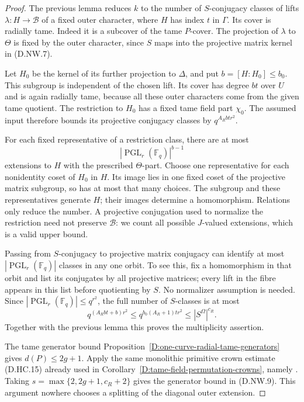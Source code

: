 \begin{proof}
The previous lemma reduces $k$ to the number of
$S$-conjugacy classes of lifts
$\lambda:H\to\mathcal B$ of a fixed outer character,
where $H$ has index $t$ in $\Gamma$. Its cover is
radially tame. Indeed it is a subcover of the tame
$P$-cover. The projection of $\lambda$ to $\Theta$
is fixed by the outer character, since $S$ maps into
the projective matrix kernel in (D.NW.7).

Let $H_0$ be the kernel of its further projection to
$\Delta$, and put $b=[H:H_0]\leq b_0$. This subgroup
is independent of the chosen lift. Its cover has
degree $bt$ over $U$ and is again radially tame,
because all these outer characters come from the
given tame quotient. The restriction to $H_0$ has a
fixed tame field part $\chi_0$. The assumed input
therefore bounds its projective conjugacy classes by
$q^{A_Rbtr^2}$.

For each fixed representative of a restriction class,
there are at most
\[
                  |\operatorname{PGL}_r(\mathbb F_q)|^{b-1}
                                                        \tag{D.NW.10}
\]
extensions to $H$ with the prescribed $\Theta$-part.
Choose one representative for each nonidentity coset
of $H_0$ in $H$. Its image lies in one fixed coset of
the projective matrix subgroup, so has at most that
many choices. The subgroup and these representatives
generate $H$; their images determine a homomorphism.
Relations only reduce the number. A projective
conjugation used to normalize the restriction need
not preserve $\mathcal B$: we count all possible
$J$-valued extensions, which is a valid upper bound.

Passing from $S$-conjugacy to projective matrix
conjugacy can identify at most
$|\operatorname{PGL}_r(\mathbb F_q)|$ classes in any
one orbit. To see this, fix a homomorphism in that
orbit and list its conjugates by all projective
matrices; every lift in the fibre appears in this
list before quotienting by $S$. No normalizer
assumption is needed. Since
$|\operatorname{PGL}_r(\mathbb F_q)|\leq q^{r^2}$,
the full number of $S$-classes is at most
\[
 q^{(A_Rbt+b)r^2}
       \leq q^{b_0(A_R+1)tr^2}
       \leq |S^\Omega|^{c_R}.                         \tag{D.NW.11}
\]
Together with the previous lemma this proves the
multiplicity assertion.

The tame generator bound
Proposition~\ref{D:one-curve-radial-tame-generators}
gives $d(P)\leq2g+1$. Apply the same monolithic
primitive crown estimate (D.HC.15) already used in
Corollary~\ref{D:tame-field-permutation-crowns}, namely
\citet[proof of Proposition 2.6(ii), equations
(2.1)--(2.2), pp.~11--13]{LucchiniMarionTracey2020D}.
Taking $s=\max\{2,2g+1,c_R+2\}$ gives the generator
bound in (D.NW.9). This argument nowhere chooses a
splitting of the diagonal outer extension.
\end{proof}
